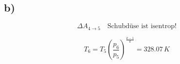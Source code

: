 

\subsection*{b)}

\[
\Delta A_{4 \rightarrow 5} \quad \text{Schubdüse ist isentrop!}
\]

\[
T_6 = T_5 \left( \frac{p_6}{p_5} \right)^{\frac{k-1}{k}} = 328.07 \, K
\]